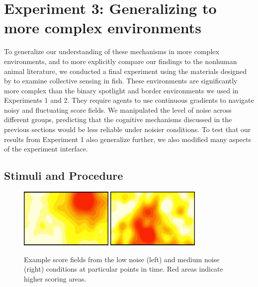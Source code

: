 \documentclass[12pt,letterpaper]{article}
\begin{document}
\section{Experiment 3: Generalizing to more complex environments}



To generalize our understanding of these mechanisms in more complex environments, and to more explicitly compare our findings to the nonhuman animal literature, we conducted a final experiment using the materials designed by  to examine collective sensing in fish.
These environments are significantly more complex than the binary spotlight and border environments we used in Experiments 1 and 2.
They require agents to use continuous gradients to navigate noisy and fluctuating score fields.
We manipulated the level of noise across different groups, predicting that the cognitive mechanisms discussed in the previous sections would be less reliable under noisier conditions. To test that our results from Experiment 1 also generalize further, we also modified many aspects of the experiment interface.

\subsection{Stimuli and Procedure}

\begin{figure}
  \centering
  \includegraphics[width=0.4\textwidth]{./figures/easy-field}
  \hspace{0.1cm}
  \includegraphics[width=0.4\textwidth]{./figures/medium-field}
  \caption{Example score fields from the low noise (left) and medium
    noise (right) conditions at particular points in time.  Red areas
    indicate higher scoring areas.}
  \label{fig:score_exp3}
\end{figure}
\end{document}
